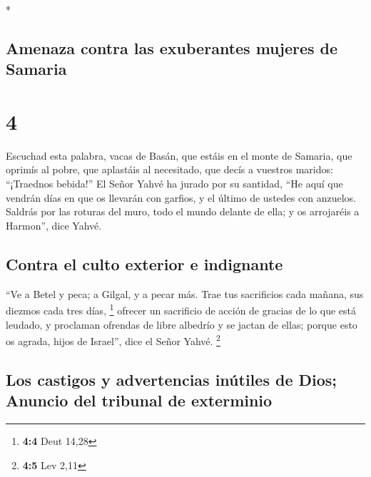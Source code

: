 \begin{paracol}{2}
\begin{otherlanguage}{english}
\end{otherlanguage}

\switchcolumn[0]*

\hypertarget{amenaza-contra-las-exuberantes-mujeres-de-samaria}{%
\subsection{Amenaza contra las exuberantes mujeres de
Samaria}\label{amenaza-contra-las-exuberantes-mujeres-de-samaria}}

\hypertarget{section-6}{%
\section{4}\label{section-6}}

 Escuchad esta palabra, vacas de Basán, que estáis en el
monte de Samaria, que oprimís al pobre, que aplastáis al necesitado, que
decís a vuestros maridos: ``¡Traednos bebida!''  El Señor
Yahvé ha jurado por su santidad, ``He aquí que vendrán días en que os
llevarán con garfios, y el último de ustedes con anzuelos.
 Saldrás por las roturas del muro, todo el mundo delante
de ella; y os arrojaréis a Harmon'', dice Yahvé.

\hypertarget{contra-el-culto-exterior-e-indignante}{%
\subsection{Contra el culto exterior e
indignante}\label{contra-el-culto-exterior-e-indignante}}

 ``Ve a Betel y peca; a Gilgal, y a pecar más. Trae tus
sacrificios cada mañana, sus diezmos cada tres días, \footnote{\textbf{4:4}
  Deut 14,28}  ofrecer un sacrificio de acción de gracias
de lo que está leudado, y proclaman ofrendas de libre albedrío y se
jactan de ellas; porque esto os agrada, hijos de Israel'', dice el Señor
Yahvé. \footnote{\textbf{4:5} Lev 2,11}

\hypertarget{los-castigos-y-advertencias-inuxfatiles-de-dios-anuncio-del-tribunal-de-exterminio}{%
\subsection{Los castigos y advertencias inútiles de Dios; Anuncio del
tribunal de
exterminio}\label{los-castigos-y-advertencias-inuxfatiles-de-dios-anuncio-del-tribunal-de-exterminio}}


\end{paracol}
